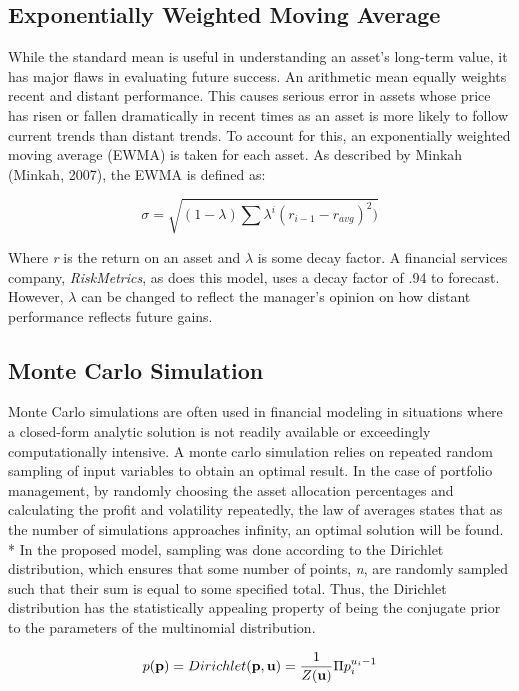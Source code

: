 \documentclass[12pt]{article}
\begin{document}
\subsection{Exponentially Weighted Moving Average}
While the standard mean is useful in understanding an asset's long-term value, it has major flaws in evaluating future success. An arithmetic mean equally weights recent and distant performance. This causes serious error in assets whose price has risen or fallen dramatically in recent times as an asset is more likely to follow current trends than distant trends. To account for this, an exponentially weighted moving average (EWMA) is taken for each asset. As described by Minkah (Minkah, 2007), the EWMA is defined as:

\begin{equation}
	\sigma = \sqrt{(1-\lambda) \sum{ \lambda^{i}(r_{i-1} - r_{avg})^2})}
\end{equation}

Where \emph{r} is the return on an asset and $\lambda$ is some decay factor. A financial services company, \emph{RiskMetrics}, as does this model, uses a decay factor of .94 to forecast. However, $\lambda$ can be changed to reflect the manager's opinion on how distant performance reflects future gains. 

\subsection{Monte Carlo Simulation}
Monte Carlo simulations are often used in financial modeling in situations where a closed-form analytic solution is not readily available or exceedingly computationally intensive. A monte carlo simulation relies on repeated random sampling of input variables to obtain an optimal result. In the case of portfolio management, by randomly choosing the asset allocation percentages and calculating the profit and volatility repeatedly, the law of averages states that as the number of simulations approaches infinity, an optimal solution will be found. \\*
In the proposed model, sampling was done according to the Dirichlet distribution, which ensures that some number of points, \emph{n}, are randomly sampled such that their sum is equal to some specified total. Thus, the Dirichlet distribution has the statistically appealing property of being the conjugate prior to the parameters of the multinomial distribution. 

\begin{equation}
	p({\bf p}) = Dirichlet({\bf p, u}) = \frac{1}{Z({\bf u})} \Pi p_{i}^{u_{i}-1}
\end{equation}
\end{document}
